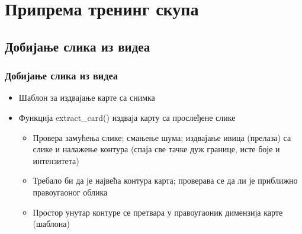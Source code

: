 \section{Припрема тренинг скупа}
\subsection{Добијање слика из видеа}
\begin{frame}
\frametitle{Добијање слика из видеа}

\begin{itemize}
 \item Шаблон за издвајање карте са снимка
 \item Функција \alert{extract\_card()} издваја карту са прослеђене слике 
 \begin{itemize}
  \item Провера замућења слике; смањење шума; издвајање ивица (прелаза)
  са слике и налажење контура (спаја све тачке дуж границе,
  исте боје и интензитета)
  \item Требало би да је највећа контура карта;
  проверава се да ли је приближно правоугаоног облика
  \item Простор унутар контуре се претвара у правоугаоник
  димензија карте (шаблона)
 \end{itemize}


\end{itemize}
\end{frame}
